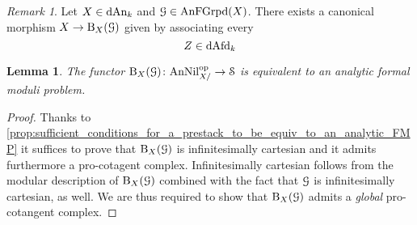 \documentclass[10pt,a4paper,reqno]{amsart} %
\theoremstyle{plain}
\newtheorem{lem}[thm]{Lemma}
\theoremstyle{definition}
\theoremstyle{remark}
\newtheorem{rem}[thm]{Remark}
\numberwithin{equation}{section}
\begin{document}
\begin{rem}
    Let $X \in \mathrm{dAn}_k$ and $\mathcal G \in \mathrm{AnFGrpd}(X)$. There exists a canonical morphism $X \to \mathrm B_X(\mathcal G)$ given by associating every 
        \[
            Z \in \mathrm{dAfd}_k
        \]
\end{rem}

\begin{lem}
    The functor $\mathrm B_X(\mathcal G) \colon \mathrm{AnNil}_{X/}^\mathrm{op} \to \mathcal S$ is equivalent to an analytic formal moduli problem.
\end{lem}

\begin{proof}
    Thanks to \cref{prop:sufficient_conditions_for_a_prestack_to_be_equiv_to_an_analytic_FMP} it suffices to prove that $\mathrm B_X(\mathcal G)$ is
    infinitesimally cartesian and it admits furthermore a pro-cotagent complex. Infinitesimally cartesian follows from the modular description
    of $\mathrm B_X(\mathcal G)$ combined with the fact that $\mathcal G$ is infinitesimally cartesian, as well. We are thus required to show that $\mathrm B_X(\mathcal G)$ admits
    a \emph{global} pro-cotangent complex. 
\end{proof}




\end{document}
